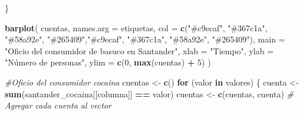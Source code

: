 \documentclass[
]{article}
\newenvironment{Shaded}{\begin{snugshade}}{\end{snugshade}}
\newcommand{\AttributeTok}[1]{\textcolor[rgb]{0.13,0.29,0.53}{#1}}
\newcommand{\CommentTok}[1]{\textcolor[rgb]{0.56,0.35,0.01}{\textit{#1}}}
\newcommand{\ControlFlowTok}[1]{\textcolor[rgb]{0.13,0.29,0.53}{\textbf{#1}}}
\newcommand{\DecValTok}[1]{\textcolor[rgb]{0.00,0.00,0.81}{#1}}
\newcommand{\FunctionTok}[1]{\textcolor[rgb]{0.13,0.29,0.53}{\textbf{#1}}}
\newcommand{\NormalTok}[1]{#1}
\newcommand{\OtherTok}[1]{\textcolor[rgb]{0.56,0.35,0.01}{#1}}
\newcommand{\SpecialCharTok}[1]{\textcolor[rgb]{0.81,0.36,0.00}{\textbf{#1}}}
\newcommand{\StringTok}[1]{\textcolor[rgb]{0.31,0.60,0.02}{#1}}
\begin{document}
\begin{Shaded}
\begin{Highlighting}[]
\NormalTok{\}}

\FunctionTok{barplot}\NormalTok{(}
\NormalTok{  cuentas,}
  \AttributeTok{names.arg =}\NormalTok{ etiquetas,}
  \AttributeTok{col =} \FunctionTok{c}\NormalTok{(}\StringTok{"\#c9ecaf"}\NormalTok{, }\StringTok{"\#367c1a"}\NormalTok{, }\StringTok{"\#58a92e"}\NormalTok{, }\StringTok{"\#265409"}\NormalTok{,}\StringTok{"\#c9ecaf"}\NormalTok{, }\StringTok{"\#367c1a"}\NormalTok{, }\StringTok{"\#58a92e"}\NormalTok{, }\StringTok{"\#265409"}\NormalTok{),}
  \AttributeTok{main =} \StringTok{"Oficio del consumidor de basuco en Santander"}\NormalTok{,}
  \AttributeTok{xlab =} \StringTok{"Tiempo"}\NormalTok{,}
  \AttributeTok{ylab =} \StringTok{"Número de personas"}\NormalTok{,}
  \AttributeTok{ylim =} \FunctionTok{c}\NormalTok{(}\DecValTok{0}\NormalTok{, }\FunctionTok{max}\NormalTok{(cuentas) }\SpecialCharTok{+} \DecValTok{5}\NormalTok{)}
\NormalTok{)}

\CommentTok{\#Oficio del consumidor cocaina }
\NormalTok{cuentas }\OtherTok{\textless{}{-}} \FunctionTok{c}\NormalTok{()}
\ControlFlowTok{for}\NormalTok{ (valor }\ControlFlowTok{in}\NormalTok{ valores) \{}
\NormalTok{  cuenta }\OtherTok{\textless{}{-}} \FunctionTok{sum}\NormalTok{(santander\_cocaina[[columna]] }\SpecialCharTok{==}\NormalTok{ valor)}
\NormalTok{  cuentas }\OtherTok{\textless{}{-}} \FunctionTok{c}\NormalTok{(cuentas, cuenta)  }\CommentTok{\# Agregar cada cuenta al vector}
  

\end{Highlighting}
\end{Shaded}
\end{document}
